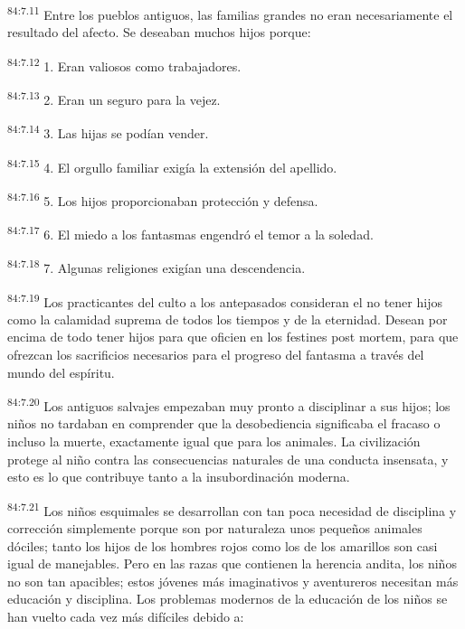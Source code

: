 \documentclass[twoside, 11pt]{book}
\begin{document}
\par
\textsuperscript{84:7.11} Entre los pueblos antiguos, las familias grandes no eran necesariamente el resultado del afecto. Se deseaban muchos hijos porque:

\par
\textsuperscript{84:7.12} 1. Eran valiosos como trabajadores.

\par
\textsuperscript{84:7.13} 2. Eran un seguro para la vejez.

\par
\textsuperscript{84:7.14} 3. Las hijas se podían vender.

\par
\textsuperscript{84:7.15} 4. El orgullo familiar exigía la extensión del apellido.

\par
\textsuperscript{84:7.16} 5. Los hijos proporcionaban protección y defensa.

\par
\textsuperscript{84:7.17} 6. El miedo a los fantasmas engendró el temor a la soledad.

\par
\textsuperscript{84:7.18} 7. Algunas religiones exigían una descendencia.

\par
\textsuperscript{84:7.19} Los practicantes del culto a los antepasados consideran el no tener hijos como la calamidad suprema de todos los tiempos y de la eternidad. Desean por encima de todo tener hijos para que oficien en los festines post mortem, para que ofrezcan los sacrificios necesarios para el progreso del fantasma a través del mundo del espíritu.

\par
\textsuperscript{84:7.20} Los antiguos salvajes empezaban muy pronto a disciplinar a sus hijos; los niños no tardaban en comprender que la desobediencia significaba el fracaso o incluso la muerte, exactamente igual que para los animales. La civilización protege al niño contra las consecuencias naturales de una conducta insensata, y esto es lo que contribuye tanto a la insubordinación moderna.

\par
\textsuperscript{84:7.21} Los niños esquimales se desarrollan con tan poca necesidad de disciplina y corrección simplemente porque son por naturaleza unos pequeños animales dóciles; tanto los hijos de los hombres rojos como los de los amarillos son casi igual de manejables. Pero en las razas que contienen la herencia andita, los niños no son tan apacibles; estos jóvenes más imaginativos y aventureros necesitan más educación y disciplina. Los problemas modernos de la educación de los niños se han vuelto cada vez más difíciles debido a:
\end{document}
